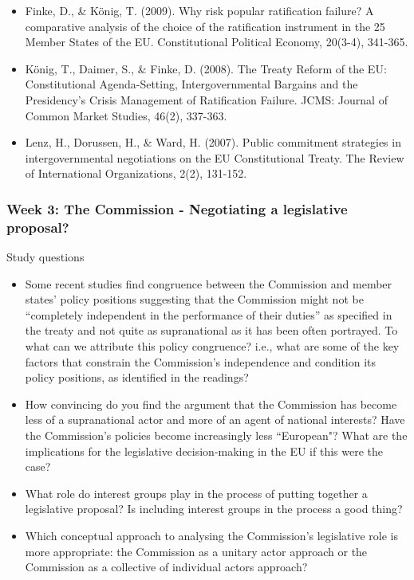\begin{itemize}
	\item Finke, D., \& K{\"o}nig, T. (2009). Why risk popular ratification failure? A comparative analysis of the choice of the ratification instrument in the 25 Member States of the EU. Constitutional Political Economy, 20(3-4), 341-365.
	\item K{\"o}nig, T., Daimer, S., \& Finke, D. (2008). The Treaty Reform of the EU: Constitutional Agenda-Setting, Intergovernmental Bargains and the Presidency's Crisis Management of Ratification Failure. JCMS: Journal of Common Market Studies, 46(2), 337-363.
	\item Lenz, H., Dorussen, H., \& Ward, H. (2007). Public commitment strategies in intergovernmental negotiations on the EU Constitutional Treaty. The Review of International Organizations, 2(2), 131-152.
	
\end{itemize}

\subsubsection*{Week 3: The Commission - Negotiating a legislative proposal?}

Study questions

\begin{itemize}
	\item Some recent studies find congruence between the Commission and member states’ policy positions suggesting that the Commission might not be “completely independent in the performance of their duties” as specified in the treaty and not quite as supranational as it has been often portrayed. To what can we attribute this policy congruence? i.e., what are some of the key factors that constrain the Commission’s independence and condition its policy positions, as identified in the readings? 
	\item How convincing do you find the argument that the Commission has become less of a supranational actor and more of an agent of national interests? Have the Commission's policies become increasingly less ``European"? What are the implications for the legislative decision-making in the EU if this were the case?
	\item What role do interest groups play in the process of putting together a legislative proposal? Is including interest groups in the process a good thing?
    \item Which conceptual approach to analysing the Commission’s legislative role is more appropriate: the Commission as a unitary actor approach or the Commission as a collective of individual actors approach?
\end{itemize}

